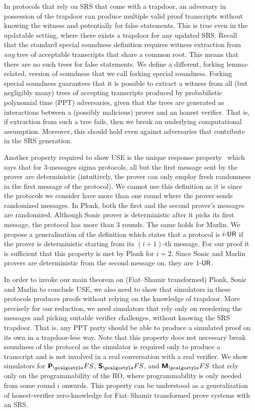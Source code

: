 In protocols that rely on SRS that come with a trapdoor, an adversary in
possession of the trapdoor can produce multiple valid proof transcripts without
knowing the witness and potentially for false statements. This is true even in
the updatable setting, where there exists a trapdoor for any updated SRS. Recall
that the standard special soundness definition requires witness extraction from
\emph{any} tree of acceptable transcripts that share a common root. This means
that there are no such trees for false statements. We define a different,
forking lemma-related, version of soundness that we call forking special soundness.
Forking special soundness guarantees that it is possible to extract a witness from all
(but negligibly many) trees of accepting transcripts produced by probabilistic
polynomial time (PPT) adversaries, given that the trees are generated as
interactions between a (possibly malicious) prover and an honest verifier. That
is, if extraction from such a tree fails, then we break an underlying
computational assumption. Moreover, this should hold even against adversaries
that contribute in the SRS generation.

  Another property required to
show USE is the unique response property~\cite{C:Fischlin05} which says that for $3$-messages
sigma protocols, all but the first message sent by the prover are deterministic (intuitively,
the prover can only employ fresh randomness in the first message of the protocol). We cannot
use this definition as it is since the protocols we consider have more than one round where the prover sends randomized
messages. In Plonk, both the first and the second prover's messages are
randomized. Although Sonic prover is deterministic after it picks its first message, the
protocol has more than $3$ rounds. The same holds for Marlin. We propose a generalisation of
the definition which states that a protocol is ${i\text{-}\mathsf{UR}}$ if the prover is deterministic starting
from its $(i + 1)$-th message. For our proof it is sufficient that this property is met by
Plonk for $i = 2$. Since Sonic and Marlin provers are deterministic from the second message on,
they are ${1\text{-}\mathsf{UR}}$.


  In order to invoke our main theorem on
(Fiat--Shamir transformed) Plonk, Sonic and Marlin to conclude USE, we also need to show
that simulators in these protocols produces proofs without relying on the knowledge of
trapdoor. More precisely for our reduction, we need simulators that rely only on reordering the
messages and picking suitable verifier challenges, without knowing the SRS trapdoor.  That is,
any PPT party should be able to produce a simulated proof on its own in a trapdoor-less
way. Note that this property does not necessary break soundness of the protocol as the
simulator is required only to produce a transcript and is not involved in a real conversation
with a real verifier. We show simulators for $\plonkprotfs$, $\sonicprotfs$, and
$\marlinprotfs$ that rely only on the programmability of the RO, where programmability is only
needed from some round $i$ onwards. This property can be understood as a generalization of honest-verifier zero-knowledge for Fiat--Shamir transformed prove systems with an SRS.

